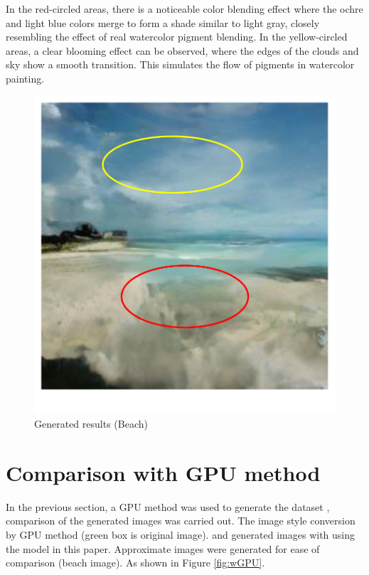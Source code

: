 \documentclass[12pt]{report}
\begin{document}
In the red-circled areas, there is a noticeable color blending effect where the ochre and light blue colors merge to form a shade similar to light gray, closely resembling the effect of real watercolor pigment blending. In the yellow-circled areas, a clear blooming effect can be observed, where the edges of the clouds and sky show a smooth transition. This simulates the flow of pigments in watercolor painting.
\newpage
\begin{figure}[htbp]
    \centering
    \includegraphics[width=15cm]{image/ResultAnalysis.pdf}
    \caption{Generated results (Beach)}
    \label{fig:ResultAnalysis}
\end{figure}

\section{Comparison with GPU method}
In the previous section, a GPU method was used to generate the dataset \cite{huang2021gpu},
comparison of the generated images was carried out. The image style conversion by GPU method (green box is original image). and generated images with using the model in this paper. Approximate images were generated for ease of comparison (beach image). As shown in Figure \ref{fig:wGPU}.
\end{document}
